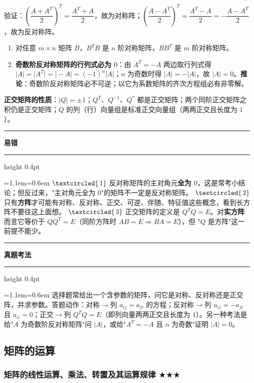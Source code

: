 \documentclass[11pt,openany,UTF8]{ctexbook}
\newcommand{\circled}[1]{\textcircled{\scriptsize\,#1}}
\newcommand{\callouthead}[2]{%
  \par\addvspace{7pt}\noindent
  {\color{#1}\rule[-0.15em]{3pt}{1.05em}}\hspace{0.5em}%
  {\bfseries\color{#1}#2}\par\nobreak\vspace{-0.35em}%
  {\color{rulesep}\hrule height 0.4pt}\nobreak\vspace{0.45em}%
  \begingroup\small\setlength{\parindent}{0pt}%
  \leftskip=1.1em\rightskip=0.6em\noindent\ignorespaces}
\newcommand{\calloutend}{\par\endgroup\addvspace{7pt}}
\newenvironment{callwarn}[1]{\callouthead{warnbar}{#1}}{\calloutend}
\newenvironment{callexam}[1]{\callouthead{exambar}{#1}}{\calloutend}
\begin{document}
验证：$\left(\dfrac{A+A^T}{2}\right)^T=\dfrac{A^T+A}{2}$，故为对称阵；$\left(\dfrac{A-A^T}{2}\right)^T=\dfrac{A^T-A}{2}=-\dfrac{A-A^T}{2}$，故为反对称阵。

\begin{enumerate}
\item 对任意 $m\times n$ 矩阵 $B$，$B^TB$ 是 $n$ 阶对称矩阵，$BB^T$ 是 $m$ 阶对称矩阵。
\item \textbf{奇数阶反对称矩阵的行列式必为 $0$}：由 $A^T=-A$ 两边取行列式得 $\vert A\vert=\vert A^T\vert=\vert -A\vert=(-1)^n\vert A\vert$；$n$ 为奇数时得 $\vert A\vert=-\vert A\vert$，故 $\vert A\vert=0$。\textbf{推论}：奇数阶反对称矩阵必不可逆；以它为系数矩阵的齐次方程组必有非零解。
\end{enumerate}
\textbf{正交矩阵的性质}：$\vert Q\vert=\pm1$；$Q^T$、$Q^{-1}$、$Q^*$ 都是正交矩阵；两个同阶正交矩阵之积仍是正交矩阵；$Q$ 的列（行）向量组是标准正交向量组（两两正交且长度为 $1$）。

\begin{callwarn}{易错}
$\circled{1}$ 反对称矩阵的主对角元\textbf{全为 $0$}，这是常考小结论；但反过来，"主对角元全为 $0$"的矩阵不一定是反对称矩阵。 $\circled{2}$ 只有\textbf{方阵}才可能有对称、反对称、正交、可逆、伴随、特征值这些概念，看到长方阵不要往这上面想。 $\circled{3}$ 正交矩阵的定义是 $Q^TQ=E$。对\textbf{实方阵}而言它等价于 $QQ^T=E$（同阶方阵时 $AB=E\Rightarrow BA=E$），但 "$Q$ 是方阵"这一前提不能少。

\end{callwarn}

\begin{callexam}{真题考法}
选择题常给出一个含参数的矩阵，问它是对称、反对称还是正交阵，并求参数。答题动作：对称$\to$列 $a_{ij}=a_{ji}$ 的方程；反对称$\to$列 $a_{ij}=-a_{ji}$ 且 $a_{ii}=0$；正交$\to$列 $Q^TQ=E$（即列向量两两正交且长度为 $1$）。另一种考法是给"$A$ 为奇数阶反对称矩阵"问 $\vert A\vert$，或给"$A^T=-A$ 且 $n$ 为奇数"证明 $\vert A\vert=0$。

\end{callexam}

\subsection{矩阵的运算}

\subsubsection{矩阵的线性运算、乘法、转置及其运算规律 $\bigstar$$\bigstar$$\bigstar$}
\end{document}
